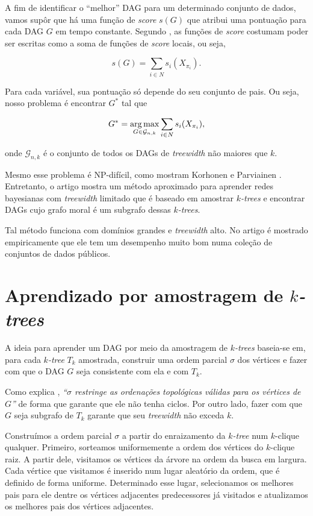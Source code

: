 \vspace{2em}

A fim de identificar o ``melhor'' DAG para um determinado conjunto de dados, vamos supôr que há uma função de \emph{score} $s(G)$ que atribui uma pontuação para cada DAG $G$ em tempo constante. Segundo \cite{nie}, as funções de \emph{score} costumam poder ser escritas como a soma de funções de \emph{score} locais, ou seja,

$$s(G) = \sum_{i \in N} s_i(X_{\pi_i}).$$

Para cada variável, sua pontuação só depende do seu conjunto de pais. Ou seja, nosso problema é encontrar $G^*$ tal que

$$G^* = \operatorname*{arg\,max}_{G \in \mathcal{G}_{n,k}} \sum_{i \in N} s_i(X_{\pi_i}),$$

onde $\mathcal{G}_{n,k}$ é o conjunto de todos os DAGs de \emph{treewidth} não maiores que $k$.

Mesmo esse problema é NP-difícil, como mostram Korhonen e Parviainen \cite{korhonen}. Entretanto, o artigo \cite{maua} mostra um método aproximado para aprender redes bayesianas com \emph{treewidth} limitado que é baseado em amostrar \emph{$k$-trees} e encontrar DAGs cujo grafo moral é um subgrafo dessas \emph{$k$-trees}.

Tal método funciona com domínios grandes e \emph{treewidth} alto. No artigo é mostrado empiricamente que ele tem um desempenho muito bom numa coleção de conjuntos de dados públicos.

\section{Aprendizado por amostragem de \emph{$k$-trees}}
\label{sec:aprendizado}

A ideia para aprender um DAG por meio da amostragem de \emph{$k$-trees} baseia-se em, para cada \emph{$k$-tree} $T_k$ amostrada, construir uma ordem parcial $\sigma$ dos vértices e fazer com que o DAG $G$ seja consistente com ela e com $T_k$.

Como explica \cite{maua}, \emph{``$\sigma$ restringe as ordenações topológicas válidas para os vértices de $G$''} de forma que garante que ele não tenha ciclos. Por outro lado, fazer com que $G$ seja subgrafo de $T_k$ garante que seu \emph{treewidth} não exceda $k$.

Construímos a ordem parcial $\sigma$ a partir do enraizamento da \emph{$k$-tree} num $k$-clique qualquer. Primeiro, sorteamos uniformemente a ordem dos vértices do $k$-clique raiz. A partir dele, visitamos os vértices da árvore na ordem da busca em largura. Cada vértice que visitamos é inserido num lugar aleatório da ordem, que é definido de forma uniforme. Determinado esse lugar, selecionamos os melhores pais para ele dentre os vértices adjacentes predecessores já visitados e atualizamos os melhores pais dos vértices adjacentes.

